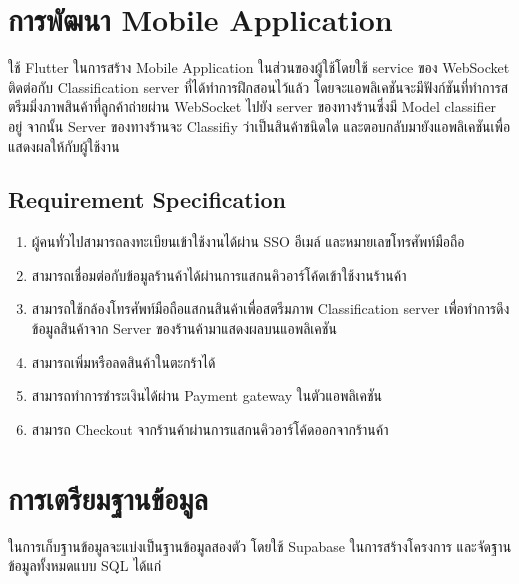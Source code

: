 \newpage

\section{การพัฒนา Mobile Application}
ใช้ Flutter ในการสร้าง Mobile Application ในส่วนของผู้ใช้โดยใช้ service ของ WebSocket ติดต่อกับ Classification server ที่ได้ทำการฝึกสอนไว้แล้ว
โดยจะแอพลิเคชันจะมีฟังก์ชันที่ทำการสตรีมมิ่งภาพสินค้าที่ลูกค้าถ่ายผ่าน WebSocket ไปยัง server ของทางร้านซึ่งมี Model classifier อยู่
จากนั้น Server ของทางร้านจะ Classifiy ว่าเป็นสินค้าชนิดใด และตอบกลับมายังแอพลิเคชันเพื่อแสดงผลให้กับผู้ใช้งาน
\subsection{Requirement Specification}

\begin{enumerate}
  \item ผู้คนทั่วไปสามารถลงทะเบียนเข้าใช้งานได้ผ่าน SSO อีเมล์ และหมายเลขโทรศัพท์มือถือ
  \item สามารถเชื่อมต่อกับข้อมูลร้านค้าได้ผ่านการแสกนคิวอาร์โค้ดเข้าใช้งานร้านค้า
  \item สามารถใช้กล้องโทรศัพท์มือถือแสกนสินค้าเพื่อสตรีมภาพ Classification server เพื่อทำการดึงข้อมูลสินค้าจาก Server ของร้านค้ามาแสดงผลบนแอพลิเคชัน
  \item สามารถเพิ่มหรือลดสินค้าในตะกร้าได้
  \item สามารถทำการชำระเงินได้ผ่าน Payment gateway ในตัวแอพลิเคชัน
  \item สามารถ Checkout จากร้านค้าผ่านการแสกนคิวอาร์โค้ดออกจากร้านค้า

\end{enumerate}


\section{การเตรียมฐานข้อมูล}
ในการเก็บฐานข้อมูลจะแบ่งเป็นฐานข้อมูลสองตัว โดยใช้ Supabase
ในการสร้างโครงการ และจัดฐานข้อมูลทั้งหมดแบบ SQL ได้แก่
